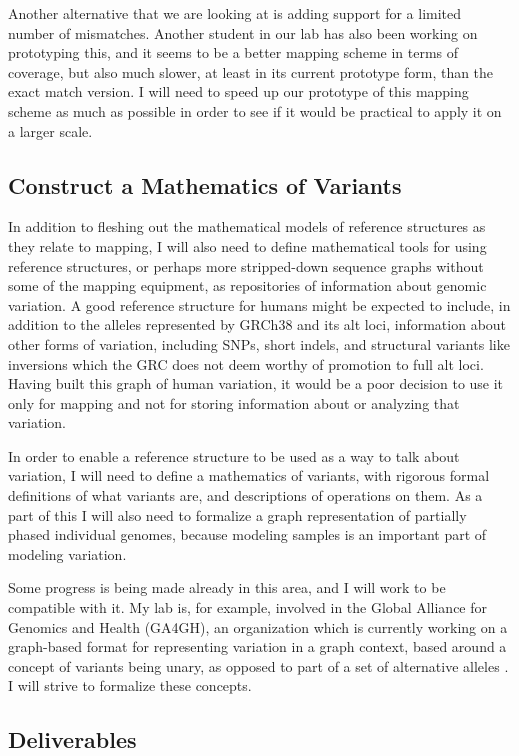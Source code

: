 \documentclass[11pt,proposal]{ucthesis}
\begin{document}
Another alternative that we are looking at is adding support for a limited number of mismatches. Another student in our lab has also been working on prototyping this, and it seems to be a better mapping scheme in terms of coverage, but also much slower, at least in its current prototype form, than the exact match version. I will need to speed up our prototype of this mapping scheme as much as possible in order to see if it would be practical to apply it on a larger scale.

\subsection{Construct a Mathematics of Variants}
\label{subsec:aim1math}

In addition to fleshing out the mathematical models of reference structures as they relate to mapping, I will also need to define mathematical tools for using reference structures, or perhaps more stripped-down sequence graphs without some of the mapping equipment, as repositories of information about genomic variation. A good reference structure for humans might be expected to include, in addition to the alleles represented by GRCh38 and its alt loci, information about other forms of variation, including SNPs, short indels, and structural variants like inversions which the GRC does not deem worthy of promotion to full alt loci. Having built this graph of human variation, it would be a poor decision to use it only for mapping and not for storing information about or analyzing that variation.

In order to enable a reference structure to be used as a way to talk about variation, I will need to define a mathematics of variants, with rigorous formal definitions of what variants are, and descriptions of operations on them. As a part of this I will also need to formalize a graph representation of partially phased individual genomes, because modeling samples is an important part of modeling variation.

Some progress is being made already in this area, and I will work to be compatible with it. My lab is, for example, involved in the Global Alliance for Genomics and Health (GA4GH), an organization which is currently working on a graph-based format for representing variation in a graph context, based around a concept of variants being unary, as opposed to part of a set of alternative alleles \cite{ga4gh2014variation}. I will strive to formalize these concepts.

\subsection{Deliverables}
\label{subsec:aim1deliverables}
\end{document}
